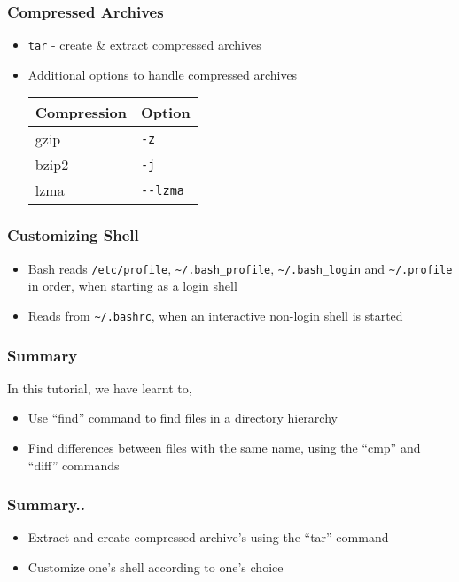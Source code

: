 \documentclass[17pt,compress]{beamer}
\begin{document}
\begin{frame}[fragile]
  \frametitle{Compressed Archives}
  \begin{itemize}
  \item \texttt{tar} - create \& extract compressed archives
  \item Additional options to handle compressed archives
    \begin{center}
      \begin{tabular}{|l|l|}\hline
        Compression      &  Option   \\\hline
        gzip   &  \texttt{-z}        \\\hline
        bzip2  &  \texttt{-j}        \\\hline
        lzma   &  \texttt{-{}-lzma}  \\\hline
      \end{tabular}
    \end{center}
  \end{itemize}
\end{frame}


\begin{frame}
\frametitle{Customizing Shell}
\begin{itemize}
\item Bash reads \texttt{/etc/profile},
  \texttt{\textasciitilde{}/.bash\_profile},
  \texttt{\textasciitilde{}/.bash\_login} and
  \texttt{\textasciitilde{}/.profile} in order, when starting
  as a login shell 
\item Reads from \texttt{\textasciitilde{}/.bashrc}, when an interactive non-login
  shell is started
\end{itemize}
\end{frame}


\begin{frame}
\frametitle{Summary}
\label{sec-8}

  In this tutorial, we have learnt to,


\begin{itemize}
\item Use ``find'' command to find files in a directory hierarchy
\item Find differences between files with the same name, using the
    ``cmp'' and ``diff'' commands
\end{itemize}
\end{frame}

\begin{frame}
\frametitle{Summary..}
\label{sec-8}

\begin{itemize}
\item Extract and create compressed archive's using the ``tar'' command
\item Customize one's shell according to one's choice
\end{itemize}
\end{frame}
\end{document}
